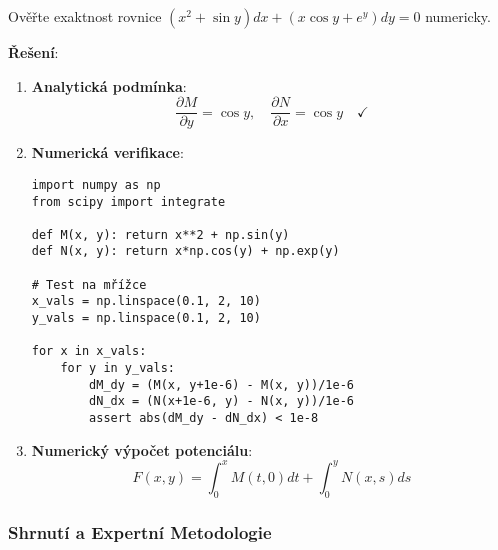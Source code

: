 \begin{example}
Ověřte exaktnost rovnice $(x^2 + \sin y)dx + (x\cos y + e^y)dy = 0$ numericky.
\vspace{0.3\baselineskip}

\textbf{Řešení}:
\begin{enumerate}
\item \textbf{Analytická podmínka}:
\[
\frac{\partial M}{\partial y} = \cos y, \quad \frac{\partial N}{\partial x} = \cos y \quad \checkmark
\]

\item \textbf{Numerická verifikace}:
\begin{verbatim}
import numpy as np
from scipy import integrate

def M(x, y): return x**2 + np.sin(y)
def N(x, y): return x*np.cos(y) + np.exp(y)

# Test na mřížce
x_vals = np.linspace(0.1, 2, 10)
y_vals = np.linspace(0.1, 2, 10)

for x in x_vals:
    for y in y_vals:
        dM_dy = (M(x, y+1e-6) - M(x, y))/1e-6
        dN_dx = (N(x+1e-6, y) - N(x, y))/1e-6
        assert abs(dM_dy - dN_dx) < 1e-8
\end{verbatim}

\item \textbf{Numerický výpočet potenciálu}:
\[
F(x, y) = \int_0^x M(t, 0)dt + \int_0^y N(x, s)ds
\]
\end{enumerate}
\end{example}

\vspace{0.8\baselineskip}

\subsubsection{Shrnutí a Expertní Metodologie}
\label{subsubsec:shrnutí-metodologie}

